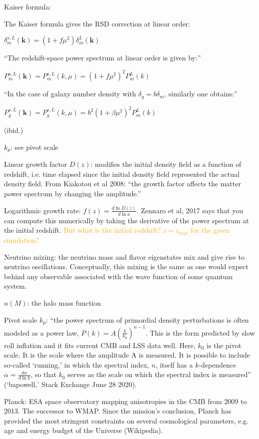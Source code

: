 \documentclass[11pt]{article}
\begin{document}
Kaiser formula:

The Kaiser formula gives the RSD correction at linear order:

$\delta_m^{s, L} (\bm{k}) = (1 + f \mu^2) \delta_m^L (\bm{k})$

``The redshift-space power spectrum at linear order is given by:''

$P_m^{s, L} (\bm{k}) = P_m^{s, L} (k, \mu) = (1 + f \mu^2)^2 P_m^L (k)$

``In the case of galaxy number density with $\delta_g = b \delta_m$, similarly
one obtains:''

$
P_g^{s, L} (\bm{k})
=
P_g^{s, L} (k, \mu)
=
b^2 (1 + \beta \mu^2)^2 P_m^L (k)
$

(ibid.)

$k_p$: see pivot scale

    Linear growth factor $D(z)$: modifies the initial density field as a
function
of redshift, i.e. time elapsed since the initial density field represented
the actual density field. From Kiakotou et al 2008: ``the growth factor
affects the matter power spectrum by changing the amplitude.''

Logarithmic growth rate: $f(z) = \frac{d \ln D(z)}{d \ln a}$. Zennaro et al,
2017 says that you can compute this numerically by taking the derivative of the
power spectrum at the initial redshift. \textcolor{orange}{But what is the
initial redshift? $z=z_\text{max}$ for the given simulation?}

Neutrino mixing: the neutrino mass and flavor eigenstates mix and give rise
to neutrino oscillations. Conceptually, this mixing is the same as  one would
expect behind any observable associated with the wave function of some quantum
system.

$n(M)$: the halo mass function

Pivot scale $k_p$: ``the power spectrum of primordial density perturbations is
often modeled as a power law, $P(k) = A \left( \frac{k}{k_0} \right)^{n - 1}$.
This is the form predicted by slow roll inflation and it fits current CMB and
LSS data well. Here, $k_0$ is the pivot scale. It is the scale where the
amplitude A is measured. It is possible to include so-called `running,' in
which the spectral index, $n$, itself has a $k$-dependence
$\alpha = \frac{dn}{d \ln k}$, so that $k_0$ serves as the scale on which the
spectral index is measured'' (`bapowell,' Stack Exchange June 28 2020).

Planck: ESA space observatory mapping anisotropies in the CMB from 2009 to
2013. The successor to WMAP. Since the mission's conclusion, Planck has
provided the most stringent constraints on several cosmological parameters,
e.g. age and energy budget of the Universe (Wikipedia).
\end{document}
